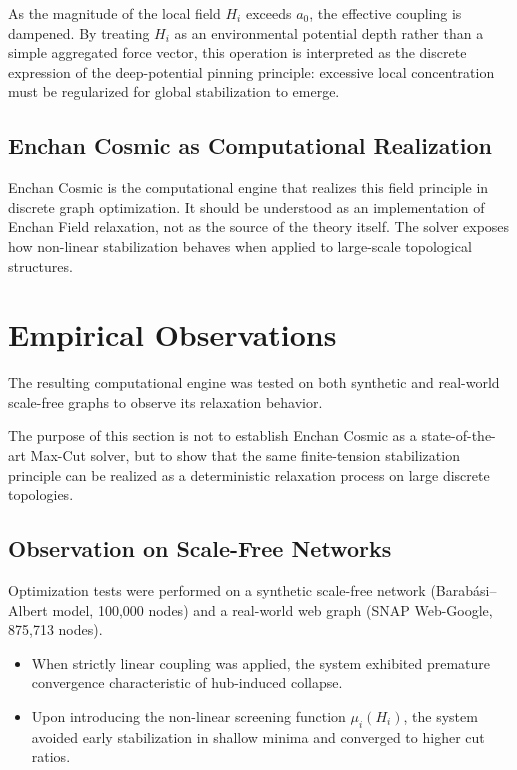 \documentclass[11pt,a4paper]{article}
\begin{document}
As the magnitude of the local field $H_i$ exceeds $a_0$, the effective coupling is dampened. By treating $H_i$ as an environmental potential depth rather than a simple aggregated force vector, this operation is interpreted as the discrete expression of the deep-potential pinning principle: excessive local concentration must be regularized for global stabilization to emerge.

\subsection{Enchan Cosmic as Computational Realization}

Enchan Cosmic is the computational engine that realizes this field principle in discrete graph optimization. It should be understood as an implementation of Enchan Field relaxation, not as the source of the theory itself. The solver exposes how non-linear stabilization behaves when applied to large-scale topological structures.

\clearpage

\section{Empirical Observations}

The resulting computational engine was tested on both synthetic and real-world scale-free graphs to observe its relaxation behavior.

The purpose of this section is not to establish Enchan Cosmic as a state-of-the-art Max-Cut solver, but to show that the same finite-tension stabilization principle can be realized as a deterministic relaxation process on large discrete topologies.

\subsection{Observation on Scale-Free Networks}
Optimization tests were performed on a synthetic scale-free network (Barab\'{a}si--Albert model, 100,000 nodes) and a real-world web graph (SNAP Web-Google, 875,713 nodes).
\begin{itemize}
    \item When strictly linear coupling was applied, the system exhibited premature convergence characteristic of hub-induced collapse.
    \item Upon introducing the non-linear screening function $\mu_i(H_i)$, the system avoided early stabilization in shallow minima and converged to higher cut ratios.
\end{itemize}
\end{document}
